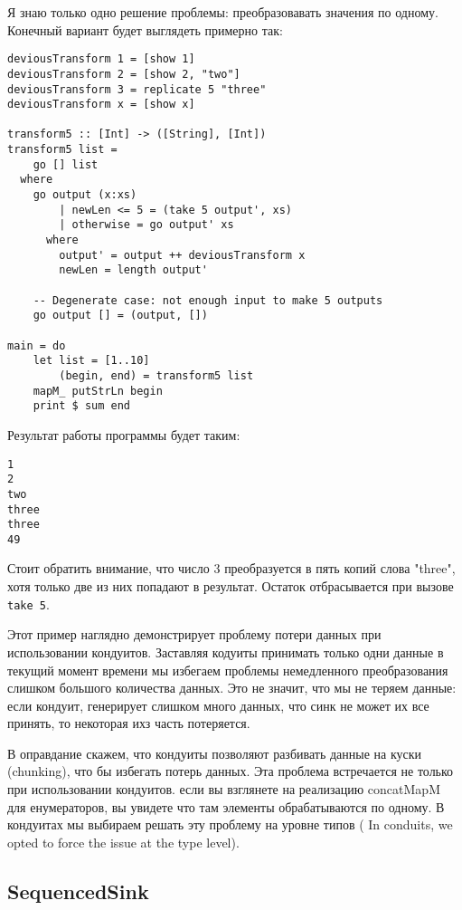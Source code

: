 Я знаю только одно решение проблемы: преобразовавать значения по одному. Конечный вариант будет выглядеть примерно так:
\begin{lstlisting}
deviousTransform 1 = [show 1]
deviousTransform 2 = [show 2, "two"]
deviousTransform 3 = replicate 5 "three"
deviousTransform x = [show x]

transform5 :: [Int] -> ([String], [Int])
transform5 list =
    go [] list
  where
    go output (x:xs)
        | newLen <= 5 = (take 5 output', xs)
        | otherwise = go output' xs
      where
        output' = output ++ deviousTransform x
        newLen = length output'

    -- Degenerate case: not enough input to make 5 outputs
    go output [] = (output, [])

main = do
    let list = [1..10]
        (begin, end) = transform5 list
    mapM_ putStrLn begin
    print $ sum end
\end{lstlisting}    
Результат работы программы будет таким:
\begin{verbatim}
1
2
two
three
three
49
\end{verbatim}
Стоит обратить внимание, что число 3 преобразуется в пять копий слова "three", хотя только две из них попадают в результат. Остаток отбрасывается при вызове \verb=take 5=.
 
Этот пример наглядно демонстрирует проблему потери данных при использовании кондуитов. Заставляя кодуиты принимать только одни данные в текущий момент времени мы избегаем проблемы немедленного преобразования слишком большого количества данных. Это не значит, что мы не теряем данные: если кондуит, генерирует слишком много данных, что синк не может их все принять, то некоторая ихз часть потеряется.
 
В оправдание скажем, что кондуиты позволяют разбивать данные на куски (chunking), что бы избегать потерь данных.
Эта проблема встречается не только при использовании кондуитов. если вы взглянете на реализацию concatMapM для енумераторов, вы увидете что там элементы обрабатываются по одному. В кондуитах мы выбираем решать эту проблему на уровне типов ( In conduits, we opted to force the issue at the type level).
 
\subsection{SequencedSink}
 
